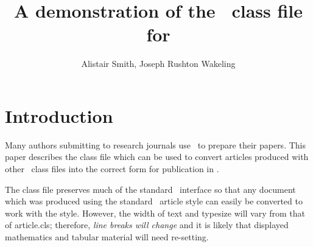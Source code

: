 \documentclass[fonts]{icst}
\begin{document}

\title{A demonstration of the \LaTeXe\ class file for
\itshape{\journalnamelc}}

\author{Alistair Smith, Joseph Rushton Wakeling}

\address{Sunrise Setting Ltd, 12a Fore Street, St. Marychurch, Torquay, Devon, TQ1~4NE, UK\\
European Alliance for Innovation (EAI), Gent, Belgium}






\maketitle

\section{Introduction}
Many authors submitting to research journals use \LaTeXe\ to
prepare their papers. This paper describes the
\textsf{\journalclass} class file which can be used to convert
articles produced with other \LaTeXe\ class files into the correct
form for publication in \emph{\journalnamelc}.

The \textsf{\journalclass} class file preserves much of the
standard \LaTeXe\ interface so that any document which was
produced using the standard \LaTeXe\ \textsf{article} style can
easily be converted to work with the \textsf{\journalclassshort}
style. However, the width of text and typesize will vary from that
of \textsf{article.cls}; therefore, \emph{line breaks will change}
and it is likely that displayed mathematics and tabular material
will need re-setting.
\end{document}
